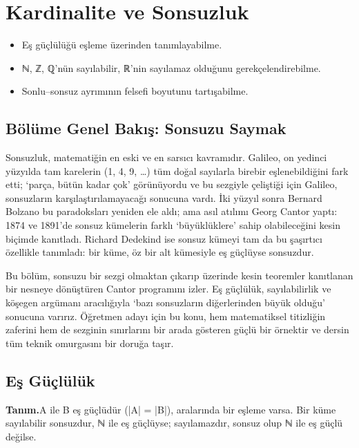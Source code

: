 \chapter{Kardinalite ve Sonsuzluk}
\label{chap:kardinalite}


\par{}\nopagebreak

\begin{itemize}\setlength{\itemsep}{2pt}\setlength{\parskip}{0pt}
\item Eş güçlülüğü eşleme üzerinden tanımlayabilme.
\item ℕ, ℤ, ℚ’nün sayılabilir, ℝ’nin sayılamaz olduğunu gerekçelendirebilme.
\item Sonlu–sonsuz ayrımının felsefi boyutunu tartışabilme.
\end{itemize}

\section*{Bölüme Genel Bakış: Sonsuzu Saymak}

Sonsuzluk, matematiğin en eski ve en sarsıcı kavramıdır. Galileo, on yedinci yüzyılda tam karelerin (1, 4, 9, …) tüm doğal sayılarla birebir eşlenebildiğini fark etti; ‘parça, bütün kadar çok’ görünüyordu ve bu sezgiyle çeliştiği için Galileo, sonsuzların karşılaştırılamayacağı sonucuna vardı. İki yüzyıl sonra Bernard Bolzano bu paradoksları yeniden ele aldı; ama asıl atılımı Georg Cantor yaptı: 1874 ve 1891’de sonsuz kümelerin farklı ‘büyüklüklere’ sahip olabileceğini kesin biçimde kanıtladı. Richard Dedekind ise sonsuz kümeyi tam da bu şaşırtıcı özellikle tanımladı: bir küme, öz bir alt kümesiyle eş güçlüyse sonsuzdur.

Bu bölüm, sonsuzu bir sezgi olmaktan çıkarıp üzerinde kesin teoremler kanıtlanan bir nesneye dönüştüren Cantor programını izler. Eş güçlülük, sayılabilirlik ve köşegen argümanı aracılığıyla ‘bazı sonsuzların diğerlerinden büyük olduğu’ sonucuna varırız. Öğretmen adayı için bu konu, hem matematiksel titizliğin zaferini hem de sezginin sınırlarını bir arada gösteren güçlü bir örnektir ve dersin tüm teknik omurgasını bir doruğa taşır.

\section{Eş Güçlülük}

\begin{tcolorbox}[bookbox,colback=cDef]\textbf{\textsf{\textcolor{cAcc}{Tanım.}}}\quad A ile B eş güçlüdür (|A| = |B|), aralarında bir eşleme varsa. Bir küme sayılabilir sonsuzdur, ℕ ile eş güçlüyse; sayılamazdır, sonsuz olup ℕ ile eş güçlü değilse.\end{tcolorbox}

